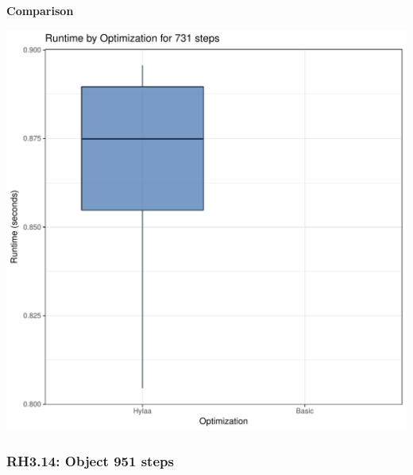 \documentclass{article}\usepackage[]{graphicx}\usepackage[]{color}
\makeatletter
\def\maxwidth{ %
  \ifdim\Gin@nat@width>\linewidth
    \linewidth
  \else
    \Gin@nat@width
  \fi
}
\newenvironment{knitrout}{}{} %
\makeatother
\begin{document}
 \textbf{Comparison}
  
\begin{knitrout}
\color{fgcolor}
\includegraphics[width=\maxwidth]{figure/RH3_steps731-1} 

\end{knitrout}


\subsubsection{RH3.14: Object 951 steps}
\end{document}
